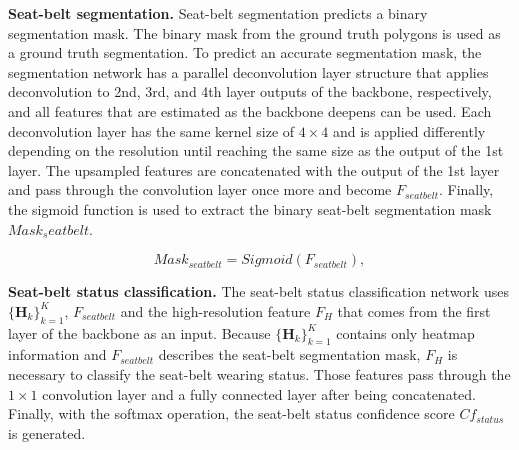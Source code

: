 \documentclass[letterpaper]{article} %
\begin{document}
\textbf{Seat-belt segmentation.} Seat-belt segmentation predicts a binary segmentation mask. The binary mask from the ground truth polygons is used as a ground truth segmentation. To predict an accurate segmentation mask, the segmentation network has a parallel deconvolution layer structure that applies deconvolution to 2nd, 3rd, and 4th layer outputs of the backbone, respectively, and all features that are estimated as the backbone deepens can be used. Each deconvolution layer has the same kernel size of $4\times4$ and is applied differently depending on the resolution until reaching the same size as the output of the 1st layer. The upsampled features are concatenated with the output of the 1st layer and pass through the convolution layer once more and become ${F}_{seatbelt}$. Finally, the sigmoid function is used to extract the binary seat-belt segmentation mask ${Mask}_seatbelt$.

\begin{equation} \label{3}
{{Mask}_{seatbelt} = Sigmoid({F}_{seatbelt})},
\end{equation}

\textbf{Seat-belt status classification.} The seat-belt status classification network uses $\{{\mathbf H}_{k}\}_{k=1}^{K}$, ${F}_{seatbelt}$ and the high-resolution feature ${F}_{H}$ that comes from the first layer of the backbone as an input. Because $\{{\mathbf H}_{k}\}_{k=1}^{K}$ contains only heatmap information and  ${F}_{seatbelt}$ describes the seat-belt segmentation mask, ${F}_{H}$ is necessary to classify the seat-belt wearing status. Those features pass through the $1\times1$ convolution layer and a fully connected layer after being concatenated. Finally, with the softmax operation, the seat-belt status confidence score ${Cf}_{status}$ is generated.
\end{document}
